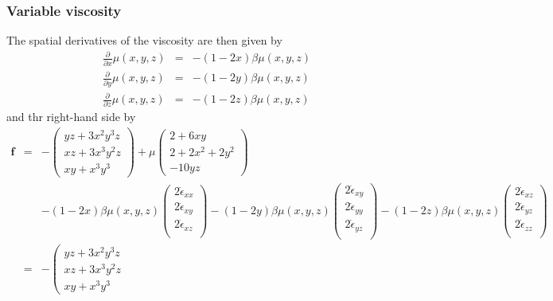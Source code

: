\subsubsection*{Variable viscosity}
The spatial derivatives of the viscosity are then given by
\begin{eqnarray}
\frac{\partial }{\partial x} \mu(x,y,z) &=& -(1-2x)\beta \mu(x,y,z) \nonumber\\
\frac{\partial }{\partial y} \mu(x,y,z) &=& -(1-2y)\beta \mu(x,y,z) \nonumber\\
\frac{\partial }{\partial z} \mu(x,y,z) &=& -(1-2z)\beta \mu(x,y,z) \nonumber
\end{eqnarray}
and thr right-hand side by
\begin{eqnarray}
{\bm f} 
&=& 
-
\left(
\begin{array}{c}
yz+3x^2y^3z\\
xz +3x^3y^2z \\
xy+x^3y^3
\end{array}
\right)
+\mu
\left(
\begin{array}{c}
2+6xy  \\
2 + 2x^2 +  2y^2 \\
-10yz 
\end{array}
\right) \\
&&
-(1-2x)\beta \mu (x,y,z)
\left(
\begin{array}{c}
2\dot{\epsilon}_{xx} \\
2\dot{\epsilon}_{xy} \\
2\dot{\epsilon}_{xz} \\
\end{array}
\right)
-(1-2y)\beta \mu (x,y,z)
\left(
\begin{array}{c}
2\dot{\epsilon}_{xy} \\
2\dot{\epsilon}_{yy} \\
2\dot{\epsilon}_{yz} \\
\end{array}
\right)
-(1-2z)\beta \mu (x,y,z)
\left(
\begin{array}{c}
2\dot{\epsilon}_{xz} \\
2\dot{\epsilon}_{yz} \\
2\dot{\epsilon}_{zz} \\
\end{array}
\right) \nonumber\\
&=& 
-
\left(
\begin{array}{c}
yz+3x^2y^3z\\
xz +3x^3y^2z \\
xy+x^3y^3
\end{array}

\end{eqnarray}
